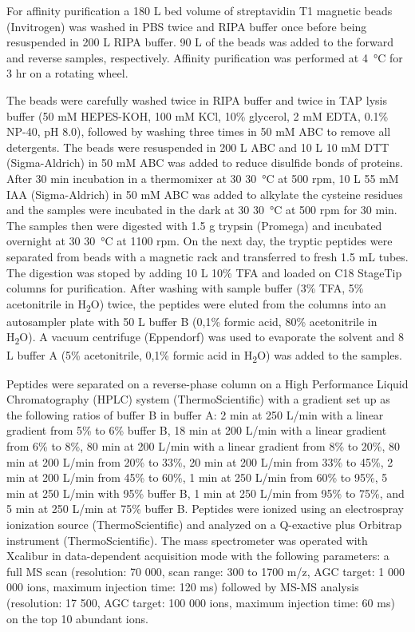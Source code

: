 For affinity purification a 180 {}\textmu L bed volume of streptavidin T1 magnetic beads (Invitrogen) was washed in PBS twice and RIPA buffer once before being resuspended in 200 {}\textmu L RIPA buffer. 90 {}\textmu L of the beads was added to the forward and reverse samples, respectively. Affinity purification was performed at \SI{4}{\celsius} for 3 hr on a rotating wheel.

The beads were carefully washed twice in RIPA buffer and twice in TAP lysis buffer (50 mM HEPES-KOH, 100 mM KCl, 10\% glycerol, 2 mM EDTA, 0.1\% NP-40, pH 8.0), followed by washing three times in 50 mM ABC to remove all detergents. The beads were resuspended in 200 {}\textmu L ABC and 10 {}\textmu L 10 mM DTT (Sigma-Aldrich) in 50 mM ABC was added to reduce disulfide bonds of proteins. After 30 min incubation in a thermomixer at 30 \SI{30}{\celsius} at 500 rpm, 10 {}\textmu L 55 mM IAA (Sigma-Aldrich) in 50 mM ABC was added to alkylate the cysteine residues and the samples were incubated in the dark at 30 \SI{30}{\celsius} at 500 rpm for 30 min. The samples then were digested with 1.5 {}\textmu g trypsin (Promega) and incubated overnight at 30 \SI{30}{\celsius} at 1100 rpm. On the next day, the tryptic peptides were separated from beads with a magnetic rack and transferred to fresh 1.5 mL tubes. The digestion was stoped by adding 10 {}\textmu L 10\% TFA and loaded on C18 StageTip columns for purification. After washing with sample buffer (3\% TFA, 5\% acetonitrile in H\textsubscript{2}O) twice, the peptides were eluted from the columns into an autosampler plate with 50 {}\textmu L buffer B (0,1\% formic acid, 80\% acetonitrile in H\textsubscript{2}O). A vacuum centrifuge (Eppendorf) was used to evaporate the solvent and 8 {}\textmu L buffer A (5\% acetonitrile, 0,1\% formic acid in H\textsubscript{2}O) was added to the samples.

Peptides were separated on a reverse-phase column on a High Performance Liquid Chromatography (HPLC) system (ThermoScientific) with a gradient set up as the following ratios of buffer B in buffer A: 2 min at 250 {}\textmu L/min with a linear gradient from 5\% to 6\% buffer B, 18 min at 200 {}\textmu L/min with a linear gradient from 6\% to 8\%, 80 min at 200 {}\textmu L/min with a linear gradient from 8\% to 20\%, 80 min at 200 {}\textmu L/min from 20\% to 33\%, 20 min at 200 {}\textmu L/min from 33\% to 45\%, 2 min at 200 {}\textmu L/min from 45\% to 60\%, 1 min at 250 {}\textmu L/min from 60\% to 95\%, 5 min at 250 {}\textmu L/min with 95\% buffer B, 1 min at 250 {}\textmu L/min from 95\% to 75\%, and 5 min at 250 {}\textmu L/min at 75\% buffer B. Peptides were ionized using an electrospray ionization source (ThermoScientific) and analyzed on a Q-exactive plus Orbitrap instrument (ThermoScientific). The mass spectrometer was operated with Xcalibur in data-dependent acquisition mode with the following parameters: a full MS scan (resolution: 70 000, scan range: 300 to 1700 m/z, AGC target: 1 000 000 ions, maximum injection time: 120 ms) followed by MS-MS analysis (resolution: 17 500, AGC target: 100 000 ions, maximum injection time: 60 ms) on the top 10 abundant ions.

